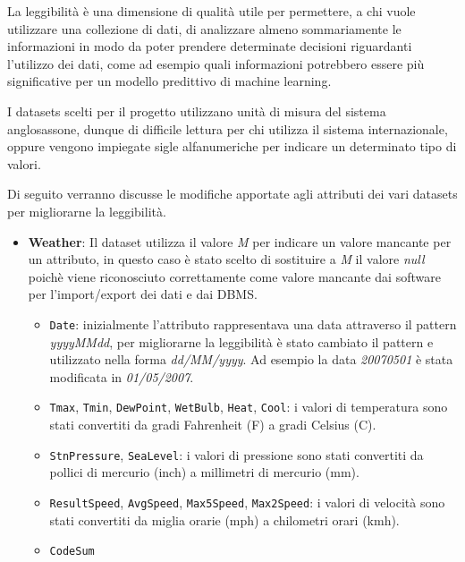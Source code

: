 La leggibilità è una dimensione di qualità utile per permettere, a chi vuole 
utilizzare una collezione di dati, di analizzare almeno sommariamente le 
informazioni in modo da poter prendere determinate decisioni riguardanti 
l'utilizzo dei dati, come ad esempio quali informazioni potrebbero essere più 
significative per un modello predittivo di machine learning.

I datasets scelti per il progetto utilizzano unità di misura del 
sistema anglosassone, dunque di difficile lettura per chi utilizza il sistema 
internazionale, oppure vengono impiegate sigle alfanumeriche per indicare 
un determinato tipo di valori. 

Di seguito verranno discusse le modifiche 
apportate agli attributi dei vari datasets per migliorarne la leggibilità.

\begin{itemize}

    \item \textbf{Weather}: Il dataset utilizza il valore \textit{M} per 
        indicare un valore mancante per un attributo, in questo caso è stato 
        scelto di sostituire a \textit{M} il valore \textit{null} poichè viene 
        riconosciuto correttamente come valore mancante dai software per 
        l'import/export dei dati e dai DBMS.
        
        \begin{itemize}
            
            \item \texttt{Date}: inizialmente l'attributo rappresentava una 
                data attraverso il pattern \textit{yyyyMMdd}, per migliorarne 
                la leggibilità è stato cambiato il pattern e utilizzato nella 
                forma \textit{dd/MM/yyyy}. Ad esempio la data 
                \textit{20070501} è stata modificata in \textit{01/05/2007}.
        
            \item \texttt{Tmax}, \texttt{Tmin}, \texttt{DewPoint}, 
                \texttt{WetBulb}, \texttt{Heat}, \texttt{Cool}: i valori di 
                temperatura sono stati convertiti da gradi Fahrenheit (F) 
                a gradi Celsius (C).

            \item \texttt{StnPressure}, \texttt{SeaLevel}: i valori di 
                pressione sono stati convertiti da pollici di mercurio (inch) a 
                millimetri di mercurio (mm).

            \item \texttt{ResultSpeed}, \texttt{AvgSpeed}, \texttt{Max5Speed}, 
                \texttt{Max2Speed}: i valori di velocità sono stati convertiti 
                da miglia orarie (mph) a chilometri orari (kmh).
                
            \item \texttt{CodeSum} %

        \end{itemize}
    
\end{itemize}


